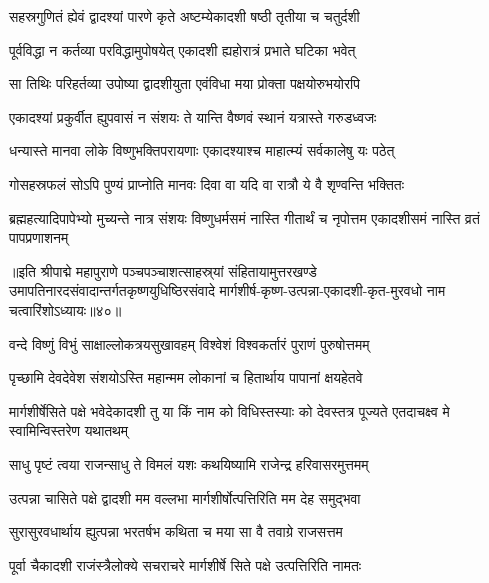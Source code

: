 \twolineshloka
{सहस्रगुणितं ह्येवं द्वादश्यां पारणे कृते}
{अष्टम्येकादशी षष्ठी तृतीया च चतुर्दशी}%

\twolineshloka
{पूर्वविद्धा न कर्तव्या परविद्धामुपोषयेत्}
{एकादशी ह्यहोरात्रं प्रभाते घटिका भवेत्}%

\twolineshloka
{सा तिथिः परिहर्तव्या उपोष्या द्वादशीयुता}
{एवंविधा मया प्रोक्ता पक्षयोरुभयोरपि}%

\twolineshloka
{एकादश्यां प्रकुर्वीत ह्युपवासं न संशयः}
{ते यान्ति वैष्णवं स्थानं यत्रास्ते गरुडध्वजः}%

\twolineshloka
{धन्यास्ते मानवा लोके विष्णुभक्तिपरायणाः}
{एकादश्याश्च माहात्म्यं सर्वकालेषु यः पठेत्}%

\twolineshloka
{गोसहस्रफलं सोऽपि पुण्यं प्राप्नोति मानवः}
{दिवा वा यदि वा रात्रौ ये वै शृण्वन्ति भक्तितः}%

\threelineshloka
{ब्रह्महत्यादिपापेभ्यो मुच्यन्ते नात्र संशयः}
{विष्णुधर्मसमं नास्ति गीतार्थं च नृपोत्तम}
{एकादशीसमं नास्ति व्रतं पापप्रणाशनम्}%

॥इति श्रीपाद्मे महापुराणे पञ्चपञ्चाशत्साहस्र्यां संहितायामुत्तरखण्डे उमापतिनारदसंवादान्तर्गतकृष्णयुधिष्ठिरसंवादे मार्गशीर्ष-कृष्ण-उत्पन्ना-एकादशी-कृत-मुरवधो नाम चत्वारिंशोऽध्यायः॥४०॥


\hyperref[sec:ekadashi_mahatmyam_padma_puranam]{\closesub}
\clearpage

\label{sec:padma-margashirsha-shukla-mokshada}



\twolineshloka
{वन्दे विष्णुं विभुं साक्षाल्लोकत्रयसुखावहम्}
{विश्वेशं विश्वकर्तारं पुराणं पुरुषोत्तमम्}%

\twolineshloka
{पृच्छामि देवदेवेश संशयोऽस्ति महान्मम}
{लोकानां च हितार्थाय पापानां क्षयहेतवे}%

\threelineshloka
{मार्गशीर्षेसिते पक्षे भवेदेकादशी तु या}
{किं नाम को विधिस्तस्याः को देवस्तत्र पूज्यते}
{एतदाचक्ष्व मे स्वामिन्विस्तरेण यथातथम्}%


\twolineshloka
{साधु पृष्टं त्वया राजन्साधु ते विमलं यशः}
{कथयिष्यामि राजेन्द्र हरिवासरमुत्तमम्}%

\twolineshloka
{उत्पन्ना चासिते पक्षे द्वादशी मम वल्लभा}
{मार्गशीर्षोत्पत्तिरिति मम देह समुद्भवा}%

\twolineshloka
{सुरासुरवधार्थाय ह्युत्पन्ना भरतर्षभ}
{कथिता च मया सा वै तवाग्रे राजसत्तम}%

\twolineshloka
{पूर्वा चैकादशी राजंस्त्रैलोक्ये सचराचरे}
{मार्गशीर्षे सिते पक्षे उत्पत्तिरिति नामतः}%

